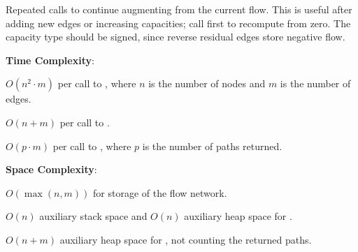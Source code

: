 Repeated calls to  continue augmenting from the current flow. This is useful after adding new edges or increasing capacities; call  first to recompute from zero. The capacity type  should be signed, since reverse residual edges store negative flow.

\textbf{Time Complexity}:
\begin{compactitem}
  \item $O(n^{2} \cdot m)$ per call to , where $n$ is the number of nodes and $m$ is the number of edges.
  \item $O(n + m)$ per call to .
  \item $O(p \cdot m)$ per call to , where $p$ is the number of paths returned.
\end{compactitem}

\textbf{Space Complexity}:
\begin{compactitem}
  \item $O(\max\left(n, m\right))$ for storage of the flow network.
  \item $O(n)$ auxiliary stack space and $O(n)$ auxiliary heap space for .
  \item $O(n + m)$ auxiliary heap space for , not counting the returned paths.
\end{compactitem}

